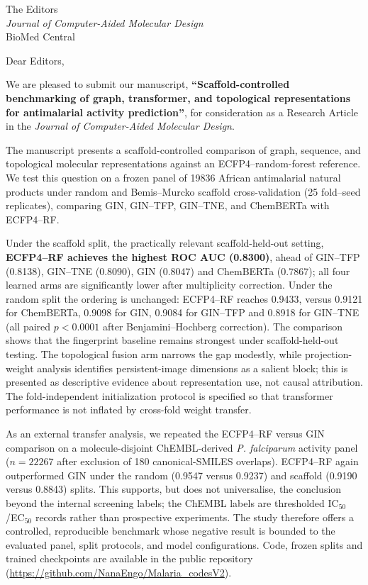 \documentclass[11pt,a4paper]{letter}
\begin{document}
\begin{letter}{%
  The Editors \\
  \textit{Journal of Computer-Aided Molecular Design} \\
  BioMed Central
}

\opening{Dear Editors,}

We are pleased to submit our manuscript, \textbf{``Scaffold-controlled benchmarking of graph, transformer, and topological representations for antimalarial activity prediction''}, for consideration as a Research Article in the \textit{Journal of Computer-Aided Molecular Design}.

The manuscript presents a scaffold-controlled comparison of graph, sequence, and topological molecular representations against an ECFP4--random-forest reference. We test this question on a frozen panel of \num{19836} African antimalarial natural products under random and Bemis--Murcko scaffold cross-validation (\num{25} fold--seed replicates), comparing GIN, GIN--TFP, GIN--TNE, and ChemBERTa with ECFP4--RF.

Under the scaffold split, the practically relevant scaffold-held-out setting, \textbf{ECFP4--RF achieves the highest ROC AUC (\num{0.8300})}, ahead of GIN--TFP (\num{0.8138}), GIN--TNE (\num{0.8090}), GIN (\num{0.8047}) and ChemBERTa (\num{0.7867}); all four learned arms are significantly lower after multiplicity correction. Under the random split the ordering is unchanged: ECFP4--RF reaches \num{0.9433}, versus \num{0.9121} for ChemBERTa, \num{0.9098} for GIN, \num{0.9084} for GIN--TFP and \num{0.8918} for GIN--TNE (all paired $p < \num{0.0001}$ after Benjamini--Hochberg correction). The comparison shows that the fingerprint baseline remains strongest under scaffold-held-out testing. The topological fusion arm narrows the gap modestly, while projection-weight analysis identifies persistent-image dimensions as a salient block; this is presented as descriptive evidence about representation use, not causal attribution. The fold-independent initialization protocol is specified so that transformer performance is not inflated by cross-fold weight transfer.

As an external transfer analysis, we repeated the ECFP4--RF versus GIN comparison on a molecule-disjoint ChEMBL-derived \textit{P. falciparum} activity panel ($n=\num{22267}$ after exclusion of \num{180} canonical-SMILES overlaps). ECFP4--RF again outperformed GIN under the random (\num{0.9547} versus \num{0.9237}) and scaffold (\num{0.9190} versus \num{0.8843}) splits. This supports, but does not universalise, the conclusion beyond the internal screening labels; the ChEMBL labels are thresholded IC$_{50}$/EC$_{50}$ records rather than prospective experiments. The study therefore offers a controlled, reproducible benchmark whose negative result is bounded to the evaluated panel, split protocols, and model configurations. Code, frozen splits and trained checkpoints are available in the public repository (\url{https://github.com/NanaEngo/Malaria_codesV2}).


\end{letter}
\end{document}
